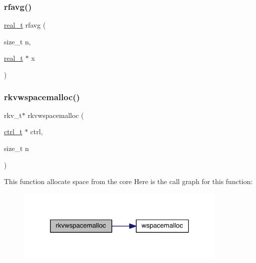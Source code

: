 \mbox{\label{a00951_a6d4ef9b662a5a5f52ad1fb32e5c14691}} 
\subsubsection{\texorpdfstring{rfavg()}{rfavg()}}
{\footnotesize\ttfamily \hyperlink{a00876_a1924a4f6907cc3833213aba1f07fcbe9}{real\+\_\+t} rfavg (\begin{DoxyParamCaption}\item[{size\+\_\+t}]{n,  }\item[{\hyperlink{a00876_a1924a4f6907cc3833213aba1f07fcbe9}{real\+\_\+t} $\ast$}]{x }\end{DoxyParamCaption})}

\mbox{\label{a00951_adfa1dc5e723d63f32672d993e3f52e4f}} 
\subsubsection{\texorpdfstring{rkvwspacemalloc()}{rkvwspacemalloc()}}
{\footnotesize\ttfamily rkv\+\_\+t$\ast$ rkvwspacemalloc (\begin{DoxyParamCaption}\item[{\hyperlink{a00742}{ctrl\+\_\+t} $\ast$}]{ctrl,  }\item[{size\+\_\+t}]{n }\end{DoxyParamCaption})}

This function allocate space from the core Here is the call graph for this function\+:\nopagebreak
\begin{figure}[H]
\begin{center}
\leavevmode
\includegraphics[width=290pt]{a00951_adfa1dc5e723d63f32672d993e3f52e4f_cgraph}
\end{center}
\end{figure}
\mbox{\label{a00951_aacc845b831d181d468644f5b679112e3}} 

